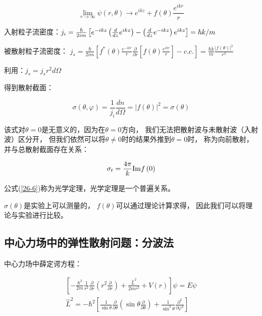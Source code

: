 \begin{equation}\label{26-4}
\mathop {\lim }\limits_{r \to \infty } \psi \left( {r,\theta } \right) \to e^{ikz}  + f\left( \theta  \right)\frac{{e^{ikr} }}{r}
\end{equation}

入射粒子流密度：$j_i  = \frac{\hbar }{{2im}}\left[ {e^{ - ikz} \left( {{\textstyle{d \over {dz}}}e^{ikz} } \right) - \left( {{\textstyle{d \over {dz}}}e^{ - ikz} } \right)e^{ikz} } \right] = {{\hbar k} \mathord{\left/
                 {\vphantom {{\hbar k} m}} \right.
                 \kern-\nulldelimiterspace} m}$


被散射粒子流密度：
$j_s  = \frac{\hbar }{{2im}}\left[ {f^* \left( \theta  \right)\frac{{e^{ - ikr} }}{r}\frac{\partial }{{\partial r}}\left[ {f\left( \theta  \right)\frac{{e^{ikr} }}{r}} \right] - c.c.} \right] = \frac{{\hbar k}}{m}\frac{{\left| {f\left( \theta  \right)} \right|^2 }}{{r^2 }}$


利用：$j_s  = j_s r^2 d\Omega $

得到散射截面：

\begin{equation}\label{26-5}
\sigma \left( {\theta ,\varphi } \right) = \frac{1}{{j_i }}\frac{{dn}}{{d\Omega }} = \left| {f\left( \theta  \right)} \right|^2  = \sigma \left( \theta  \right)
\end{equation}


该式对$\theta = 0$是无意义的，因为在$\theta = 0$方向，
我们无法把散射波与未散射波（入射波）区分开，
但我们依然可以将$\theta  \ne 0$时的结果外推到$\theta = 0$时，
称为向前散射，并与总散射截面存在关系：

\begin{equation}\label{26-6}
\sigma _t  = \frac{{4\pi }}{k}{\mathop{\rm Im}\nolimits} f\left( 0 \right)
\end{equation}

公式(\ref{26-6})称为光学定理，光学定理是一个普遍关系。


$\sigma \left( \theta  \right)$是实验上可以测量的，
$f\left( \theta  \right)$可以通过理论计算求得，
因此我们可以将理论与实验进行比较。

\subsection{中心力场中的弹性散射问题：分波法}


中心力场中薛定谔方程：

\begin{eqnarray}
\left[ { - \frac{{\hbar ^2 }}{{2m}}\frac{1}{{r^2 }}\frac{\partial }{{\partial r}}\left( {r^2 \frac{\partial }{{\partial r}}} \right) + \frac{{\widehat L^2 }}{{2mr^2 }} + V(r)} \right]\psi  = E\psi \\
\widehat L^2  =  - \hbar ^2 \left[ {\frac{1}{{\sin \theta }}\frac{\partial }{{\partial \theta }}\left( {\sin \theta \frac{\partial }{{\partial \theta }}} \right) + \frac{1}{{\sin ^2 \theta }}\frac{{\partial ^2 }}{{\partial \varphi ^2 }}} \right]
 \end{eqnarray}

